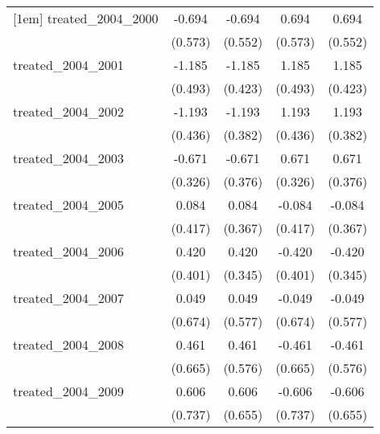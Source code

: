 {\begin{tabular}{l*{4}{c}}
[1em]
treated\_2004\_2000&      -0.694         &      -0.694         &       0.694         &       0.694         \\
            &     (0.573)         &     (0.552)         &     (0.573)         &     (0.552)         \\
[1em]
treated\_2004\_2001&      -1.185\sym{*}  &      -1.185\sym{**} &       1.185\sym{*}  &       1.185\sym{**} \\
            &     (0.493)         &     (0.423)         &     (0.493)         &     (0.423)         \\
[1em]
treated\_2004\_2002&      -1.193\sym{**} &      -1.193\sym{**} &       1.193\sym{**} &       1.193\sym{**} \\
            &     (0.436)         &     (0.382)         &     (0.436)         &     (0.382)         \\
[1em]
treated\_2004\_2003&      -0.671\sym{*}  &      -0.671         &       0.671\sym{*}  &       0.671         \\
            &     (0.326)         &     (0.376)         &     (0.326)         &     (0.376)         \\
[1em]
treated\_2004\_2005&       0.084         &       0.084         &      -0.084         &      -0.084         \\
            &     (0.417)         &     (0.367)         &     (0.417)         &     (0.367)         \\
[1em]
treated\_2004\_2006&       0.420         &       0.420         &      -0.420         &      -0.420         \\
            &     (0.401)         &     (0.345)         &     (0.401)         &     (0.345)         \\
[1em]
treated\_2004\_2007&       0.049         &       0.049         &      -0.049         &      -0.049         \\
            &     (0.674)         &     (0.577)         &     (0.674)         &     (0.577)         \\
[1em]
treated\_2004\_2008&       0.461         &       0.461         &      -0.461         &      -0.461         \\
            &     (0.665)         &     (0.576)         &     (0.665)         &     (0.576)         \\
[1em]
treated\_2004\_2009&       0.606         &       0.606         &      -0.606         &      -0.606         \\
            &     (0.737)         &     (0.655)         &     (0.737)         &     (0.655)         \\

\end{tabular}}
